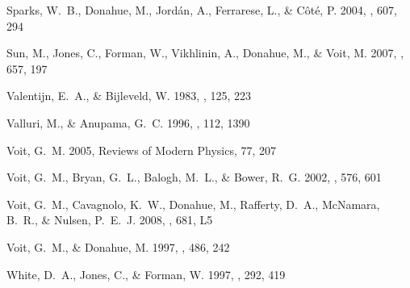 \documentclass[12pt,preprint]{aastex}
\begin{document}
\begin{thebibliography}{44}
{Sparks}, W.~B., {Donahue}, M., {Jord{\'a}n}, A., {Ferrarese}, L., \&
  {C{\^o}t{\'e}}, P. 2004, \apj, 607, 294

{Sun}, M., {Jones}, C., {Forman}, W., {Vikhlinin}, A., {Donahue}, M., \&
  {Voit}, M. 2007, \apj, 657, 197

{Valentijn}, E.~A., \& {Bijleveld}, W. 1983, \aap, 125, 223

{Valluri}, M., \& {Anupama}, G.~C. 1996, \aj, 112, 1390

{Voit}, G.~M. 2005, Reviews of Modern Physics, 77, 207

{Voit}, G.~M., {Bryan}, G.~L., {Balogh}, M.~L., \& {Bower}, R.~G. 2002, \apj,
  576, 601

{Voit}, G.~M., {Cavagnolo}, K.~W., {Donahue}, M., {Rafferty}, D.~A.,
  {McNamara}, B.~R., \& {Nulsen}, P.~E.~J. 2008, \apjl, 681, L5

{Voit}, G.~M., \& {Donahue}, M. 1997, \apj, 486, 242

{White}, D.~A., {Jones}, C., \& {Forman}, W. 1997, \mnras, 292, 419

\end{thebibliography}
\end{document}
